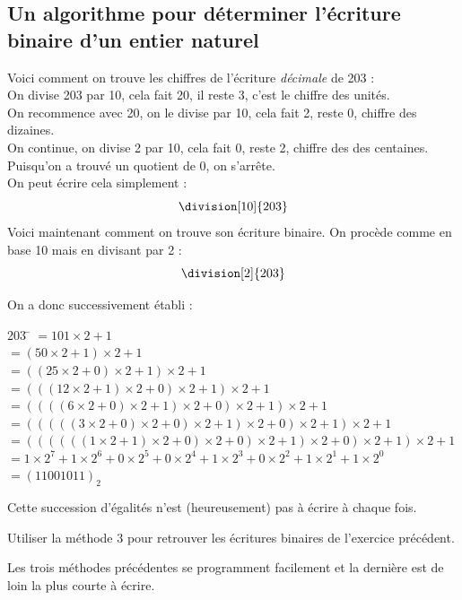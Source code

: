 \subsection{Un algorithme pour déterminer l'écriture binaire d'un entier naturel}
\begin{methode}
    Voici comment on trouve les chiffres de l'écriture \textit{décimale} de 203 :\\
    
    On divise 203 par 10, cela fait 20, il reste 3, c'est le chiffre des unités.\\
    On recommence avec 20, on le divise par 10, cela fait 2, reste 0, chiffre des dizaines.\\
    On continue, on divise 2 par 10, cela fait 0, reste 2, chiffre des des centaines.\\
    Puisqu'on a trouvé un quotient de 0, on s'arrête.\\
    On peut écrire cela simplement :
    $$\division[10]{203}$$
    Voici maintenant comment on trouve son écriture binaire. On procède comme en base 10 mais en divisant par 2 :
    $$\division[2]{203}$$
    
    On a donc successivement établi :
    \begin{tabbing}
        203	\= 	$=101\times 2 +1$	\\
        \>	$=(50\times 2 +1)\times 2+1  $	\\
        \>	$=((25\times 2 +0)\times 2 +1)\times 2+1  $	\\
        \>	$=(((12\times 2 +1)\times 2 +0)\times 2 +1)\times 2+1  $	\\
        \>	$=((((6\times 2 +0)\times 2 +1)\times 2 +0)\times 2 +1)\times 2+1  $	\\
        \>	$=(((((3\times 2 +0)\times 2 +0)\times 2 +1)\times 2 +0)\times 2 +1)\times 2+1  $	\\
        \>	$=((((((1\times 2 +1)\times 2 +0)\times 2 +0)\times 2 +1)\times 2 +0)\times 2 +1)\times 2+1  $	\\
        
        \>	$=1\times 2^7+1\times 2^6+0\times 2^5 + 0\times 2^4 +1\times 2^3+0\times 2^2 + 1\times 2^1+1\times
            2^0$\\
        \> $=(11001011)_2$
    \end{tabbing}
    Cette succession d'égalités n'est (heureusement) pas à écrire à chaque fois.
\end{methode}

\begin{exercice}[]
    Utiliser la méthode 3 pour retrouver les écritures binaires de l'exercice précédent.
\end{exercice}
Les trois méthodes précédentes se programment facilement et la dernière est de loin la plus courte à écrire.

